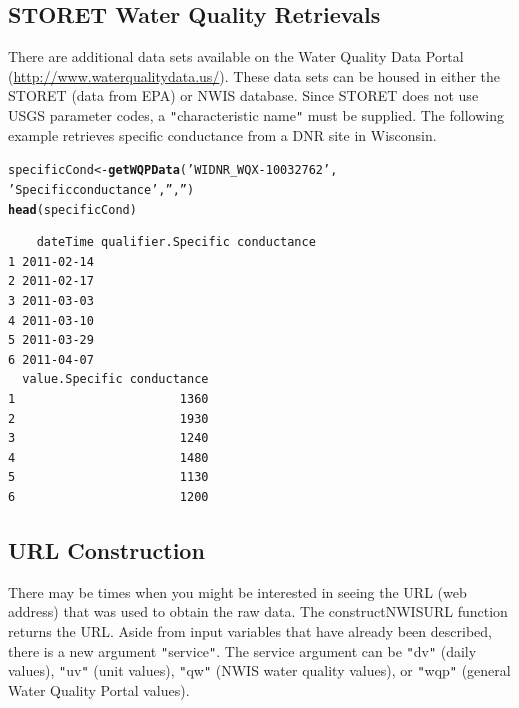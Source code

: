 \documentclass[a4paper,11pt]{article}\usepackage[]{graphicx}\usepackage[]{color}
\makeatletter
\newcommand{\hlstr}[1]{\textcolor[rgb]{0.192,0.494,0.8}{#1}}%
\newcommand{\hlstd}[1]{\textcolor[rgb]{0.345,0.345,0.345}{#1}}%
\newcommand{\hlkwb}[1]{\textcolor[rgb]{0.69,0.353,0.396}{#1}}%
\newcommand{\hlkwd}[1]{\textcolor[rgb]{0.737,0.353,0.396}{\textbf{#1}}}%
\newenvironment{kframe}{%
 \def\at@end@of@kframe{}%
 \ifinner\ifhmode%
  \def\at@end@of@kframe{\end{minipage}}%
  \begin{minipage}{\columnwidth}%
 \fi\fi%
 \def\FrameCommand##1{\hskip\@totalleftmargin \hskip-\fboxsep
 \colorbox{shadecolor}{##1}\hskip-\fboxsep
     \hskip-\linewidth \hskip-\@totalleftmargin \hskip\columnwidth}%
 \MakeFramed {\advance\hsize-\width
   \@totalleftmargin\z@ \linewidth\hsize
   \@setminipage}}%
 {\par\unskip\endMakeFramed%
 \at@end@of@kframe}
\newenvironment{knitrout}{}{} %
\makeatother
\begin{document}
\FloatBarrier

\subsection{STORET Water Quality Retrievals}
\label{sec:usgsSTORET}
There are additional data sets available on the Water Quality Data Portal (\url{http://www.waterqualitydata.us/}).  These data sets can be housed in either the STORET (data from EPA) or NWIS database.  Since STORET does not use USGS parameter codes, a \texttt{"}characteristic name\texttt{"} must be supplied.  The following example retrieves specific conductance from a DNR site in Wisconsin.

\begin{knitrout}
\color{fgcolor}\begin{kframe}
\begin{alltt}
\hlstd{specificCond} \hlkwb{<-} \hlkwd{getWQPData}\hlstd{(}\hlstr{'WIDNR_WQX-10032762'}\hlstd{,}
        \hlstr{'Specific conductance'}\hlstd{,} \hlstr{''}\hlstd{,} \hlstr{''}\hlstd{)}
\hlkwd{head}\hlstd{(specificCond)}
\end{alltt}
\begin{verbatim}
    dateTime qualifier.Specific conductance
1 2011-02-14                               
2 2011-02-17                               
3 2011-03-03                               
4 2011-03-10                               
5 2011-03-29                               
6 2011-04-07                               
  value.Specific conductance
1                       1360
2                       1930
3                       1240
4                       1480
5                       1130
6                       1200
\end{verbatim}
\end{kframe}
\end{knitrout}


\FloatBarrier
\subsection{URL Construction}
\label{sec:usgsURL}
There may be times when you might be interested in seeing the URL (web address) that was used to obtain the raw data. The constructNWISURL function returns the URL.  Aside from input variables that have already been described, there is a new argument \texttt{"}service\texttt{"}. The service argument can be \texttt{"}dv\texttt{"} (daily values), \texttt{"}uv\texttt{"} (unit values), \texttt{"}qw\texttt{"} (NWIS water quality values), or \texttt{"}wqp\texttt{"} (general Water Quality Portal values).
 
\end{document}
